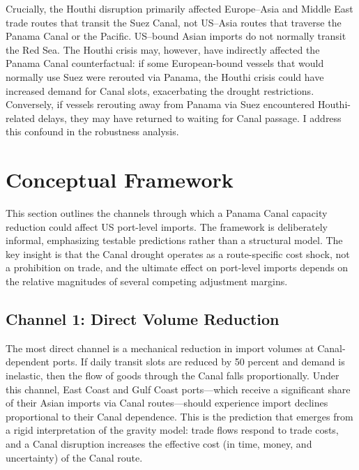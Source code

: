 \documentclass[12pt]{article}
\begin{document}
Crucially, the Houthi disruption primarily affected Europe--Asia and Middle East trade routes that transit the Suez Canal, not US--Asia routes that traverse the Panama Canal or the Pacific. US--bound Asian imports do not normally transit the Red Sea. The Houthi crisis may, however, have indirectly affected the Panama Canal counterfactual: if some European-bound vessels that would normally use Suez were rerouted via Panama, the Houthi crisis could have increased demand for Canal slots, exacerbating the drought restrictions. Conversely, if vessels rerouting away from Panama via Suez encountered Houthi-related delays, they may have returned to waiting for Canal passage. I address this confound in the robustness analysis.


\section{Conceptual Framework}
\label{sec:framework}

This section outlines the channels through which a Panama Canal capacity reduction could affect US port-level imports. The framework is deliberately informal, emphasizing testable predictions rather than a structural model. The key insight is that the Canal drought operates as a route-specific cost shock, not a prohibition on trade, and the ultimate effect on port-level imports depends on the relative magnitudes of several competing adjustment margins.

\subsection{Channel 1: Direct Volume Reduction}

The most direct channel is a mechanical reduction in import volumes at Canal-dependent ports. If daily transit slots are reduced by 50 percent and demand is inelastic, then the flow of goods through the Canal falls proportionally. Under this channel, East Coast and Gulf Coast ports---which receive a significant share of their Asian imports via Canal routes---should experience import declines proportional to their Canal dependence. This is the prediction that emerges from a rigid interpretation of the gravity model: trade flows respond to trade costs, and a Canal disruption increases the effective cost (in time, money, and uncertainty) of the Canal route.
\end{document}
